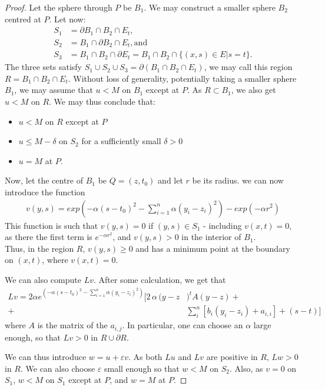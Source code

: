 \begin{proof}
	Let the sphere through $P$ be $B_1$. We may construct a smaller sphere $B_2$ centred at $P$. Let now:
	\begin{align*}
		S_1 &= \partial B_1 \cap  B_2 \cap E_t, \\
		S_2 &= B_1 \cap \partial  B_2 \cap E_t, \mathrm{ and} \\
		S_3 &= B_1 \cap  B_2 \cap \partial E_t= B_1 \cap  B_2 \cap \{(x, s) \in E | s=t\}.
	\end{align*}
	The three sets satisfy $S_1\cup S_2 \cup S_3 = \partial (B_1 \cap  B_2 \cap E_t)$, we may call this region $R=B_1 \cap  B_2 \cap E_t$. Without loss of generality, potentially taking a smaller sphere $B_1$, we may assume that $u<M$ on $B_1$ except at $P$. As $R \subset B_1$, we also get  $u<M$ on $R$. 
	We may thus conclude that: 
	\begin{itemize}\itemsep0em 
		\item  $u<M$ on $R$ except at $P$
		\item  $u\leq M-\delta$ on $S_2$ for a sufficiently small $\delta>0$
		\item  $u=M$ at $P$.
	\end{itemize}	
	Now, let the centre of $B_1$ be $Q=(z, t_0)$ and let $r$ be its radius. we can now introduce the function	
	\begin{align*}
		v(y, s) = exp \left(-\alpha(s-t_0)^2-\sum_{i=1}^n\alpha(y_i-z_i)^2\right) - exp\left(-\alpha r^2\right)
	\end{align*}
	This function is such that $v(y, s)=0$ if $(y, s)\in S_1$ - including  $v(x, t)=0$, as there the first term is $e^{-\alpha r^2}$, and $v(y, s)>0$ in the interior of $B_1$.  \\
	Thus, in the region $R$, $v(y, s)\geq0$ and has a minimum point at the boundary on $(x, t)$, where  $v(x, t)=0$.
	
	We can also compute $Lv$. After some calculation, we get that 
	\begin{align*}
		Lv = 2 \alpha e^{\left(-\alpha(s-t_0)^2-\sum_{i=1}^n\alpha(y_i-z_i)^2\right)}[2\, \alpha\, (y-z&)^t A (y-z) +\\
		+&\sum_{i}^n[ b_i (y_i-z_i)+a_{i,i}]+(s-t)]
	\end{align*}
	where $A$ is the matrix of the $a_{i,j}$. In particular, one can choose an $\alpha$ large enough, so that $Lv>0$ in $R\cup \partial R$.
	
	We can thus introduce $w=u+\varepsilon v$. As both $Lu$ and $Lv$ are positive in $R$, $Lw>0$ in $R$. We can also choose $\varepsilon$ small enough so that $w<M$ on $S_2$. Also, as $v=0$ on $S_1$, $w<M$ on $S_1$ except at $P$, and $w=M$ at $P$.
	

\end{proof}

